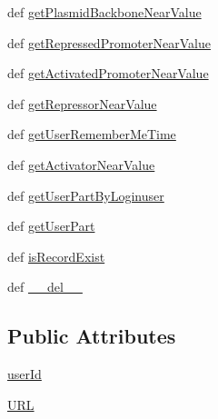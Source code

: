 \begin{DoxyCompactItemize}
\item 
def \hyperlink{classweb_1_1database_1_1_sqlite_database_a76974e387adbcd53d912f7375e432106}{get\-Plasmid\-Backbone\-Near\-Value}
\item 
def \hyperlink{classweb_1_1database_1_1_sqlite_database_ad9fa566c6ea0c8fa75d402bd1502f38b}{get\-Repressed\-Promoter\-Near\-Value}
\item 
def \hyperlink{classweb_1_1database_1_1_sqlite_database_aa3bd1c42a4c0f6b02b88997ba4a93b10}{get\-Activated\-Promoter\-Near\-Value}
\item 
def \hyperlink{classweb_1_1database_1_1_sqlite_database_acc8b22451ed67b7cef441a410579c8fc}{get\-Repressor\-Near\-Value}
\item 
def \hyperlink{classweb_1_1database_1_1_sqlite_database_a0a1547b97144bbf9fdea490387d7e4f8}{get\-User\-Remember\-Me\-Time}
\item 
def \hyperlink{classweb_1_1database_1_1_sqlite_database_a946b12e6b15ea6dffbcaa453818bbedd}{get\-Activator\-Near\-Value}
\item 
def \hyperlink{classweb_1_1database_1_1_sqlite_database_aac6cf2ce78b08436e1c44cc979d06225}{get\-User\-Part\-By\-Loginuser}
\item 
def \hyperlink{classweb_1_1database_1_1_sqlite_database_a62261b89a196a4b1b2b9a1a016925789}{get\-User\-Part}
\item 
def \hyperlink{classweb_1_1database_1_1_sqlite_database_a529d46c1b86c6e2f3ecbb773c552e085}{is\-Record\-Exist}
\item 
def \hyperlink{classweb_1_1database_1_1_sqlite_database_af74c7257253d78463e50fec22594a023}{\-\_\-\-\_\-del\-\_\-\-\_\-}
\end{DoxyCompactItemize}
\subsection*{Public Attributes}
\begin{DoxyCompactItemize}
\item 
\hyperlink{classweb_1_1database_1_1_sqlite_database_ad4ed7fe25d1d69bb149e881715af580a}{user\-Id}
\item 
\hyperlink{classweb_1_1database_1_1_sqlite_database_af0fe8bdf0c15d77b821281a86e49bd81}{U\-R\-L}
\end{DoxyCompactItemize}
